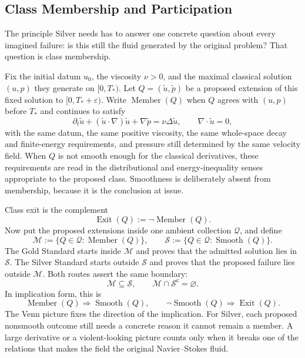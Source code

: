 \subsection{Class Membership and Participation}\label{sub:ClassMembershipAndParticipation}

The principle Silver needs has to answer one concrete question about every imagined failure: is this still the fluid generated by the original problem?
That question is class membership.

Fix the initial datum \(u_0\), the viscosity \(\nu>0\), and the maximal classical solution \((u,p)\) they generate on \([0,T_*)\).
Let \(Q=(\widetilde u,\widetilde p)\) be a proposed extension of this fixed solution to \([0,T_*+\varepsilon)\).
Write \(\operatorname{Member}(Q)\) when \(Q\) agrees with \((u,p)\) before \(T_*\) and continues to satisfy
\[
  \partial_t\widetilde u
  +(\widetilde u\cdot\nabla)\widetilde u
  +\nabla\widetilde p
  =
  \nu\Delta\widetilde u,
  \qquad
  \nabla\cdot\widetilde u=0,
\]
with the same datum, the same positive viscosity, the same whole-space decay and finite-energy requirements, and pressure still determined by the same velocity field.
When \(Q\) is not smooth enough for the classical derivatives, these requirements are read in the distributional and energy-inequality senses appropriate to the proposed class.
Smoothness is deliberately absent from membership, because it is the conclusion at issue.

Class exit is the complement
\[
  \operatorname{Exit}(Q)
  :=
  \neg\operatorname{Member}(Q).
\]
Now put the proposed extensions inside one ambient collection \(\mathcal Q\), and define
\[
  \mathcal M
  :=
  \{Q\in\mathcal Q:\operatorname{Member}(Q)\},
  \qquad
  \mathcal S
  :=
  \{Q\in\mathcal Q:\operatorname{Smooth}(Q)\}.
\]
The Gold Standard starts inside \(\mathcal M\) and proves that the admitted solution lies in \(\mathcal S\).
The Silver Standard starts outside \(\mathcal S\) and proves that the proposed failure lies outside \(\mathcal M\).
Both routes assert the same boundary:
\[
  \mathcal M\subseteq\mathcal S,
  \qquad
  \mathcal M\cap\mathcal S^{\mathsf c}=\varnothing.
\]
In implication form, this is
\[
  \operatorname{Member}(Q)
  \Longrightarrow
  \operatorname{Smooth}(Q),
  \qquad
  \neg\operatorname{Smooth}(Q)
  \Longrightarrow
  \operatorname{Exit}(Q).
\]
The Venn picture fixes the direction of the implication.
For Silver, each proposed nonsmooth outcome still needs a concrete reason it cannot remain a member.
A large derivative or a violent-looking picture counts only when it breaks one of the relations that makes the field the original Navier--Stokes fluid.

